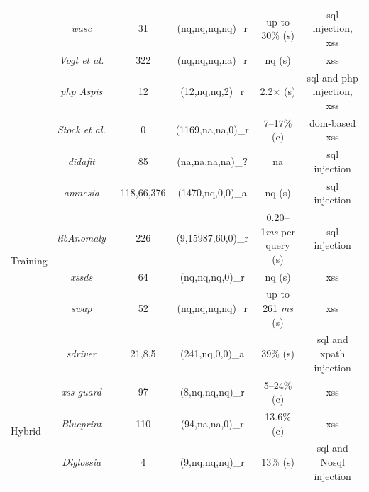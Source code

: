 \documentclass[conference]{IEEEtran}
\newcommand{\xmark}{\ding{56}}
\begin{document}
\begin{landscape}
\begin{table}
\begin{threeparttable}
\begin{small}
{\begin{tabular}{l|c|c|cc|c}
  &  	{\it {\sc wasc}}~\cite{NLC07} & 31 & ({\sc nq},{\sc nq},{\sc nq},{\sc nq})\_r & up to 30\% ({\sc s}) & {\sc sql} injection, {\sc xss} \\
	&  	{\it Vogt et al.}~\cite{VFJKKV07} & 322 & ({\sc nq},{\sc nq},{\sc nq},{\sc na})\_r & {\sc nq} ({\sc s}) & {\sc xss} \\
	&  	{\it {\sc php} Aspis}~\cite{PMP11} & 12 & (12,{\sc nq},{\sc nq},2)\_r & 2.2$\times$ ({\sc s}) & {\sc sql} and {\sc php} injection, {\sc xss} \\
	& 	{\it Stock et al.}~\cite{SLMS14} & 0 & (1169,{\sc na},{\sc na},0)\_r & 7--17\% ({\sc c}) & {\sc dom}-based {\sc xss} \\
	\hline
	\hline  
  \multirow{6}{*}{Training}
  &   {\it {\sc didafit}}~\cite{LLW02} & 85 & ({\sc na},{\sc na},{\sc na},{\sc na})\_{\bf ?} & {\sc na} & {\sc sql} injection \\
	&   {\it {\sc amnesia}}~\cite{HO05,HO06,HO05b} & 118,66,376 & (1470,{\sc nq},0,0)\_a & {\sc nq} ({\sc s}) & {\sc sql} injection \\ 
	&   {\it libAnomaly}~\cite{VMV05} & 226 & (9,15987,60,0)\_r & 0.20--1{\it ms} per query ({\sc s}) & {\sc sql} injection \\
	& 	{\it {\sc xssds}}~\cite{JEP08} & 64 & ({\sc nq},{\sc nq},{\sc nq},0)\_r & {\sc nq} ({\sc s}) & {\sc xss} \\
  & 	{\it {\sc swap}}~\cite{WPLKK09} & 52 & ({\sc nq},{\sc nq},{\sc nq},{\sc nq})\_r & up to 261 {\it ms} ({\sc s}) & {\sc xss} \\ 
	& 	{\it {\sc sd}river}~\cite{MS09,MKS09,MKLS11} & 21,8,5 & (241,{\sc nq},0,0)\_a & 39\% ({\sc s}) & {\sc sql} and {\sc xp}ath injection \\
  \hline
  \hline
  \multirow{3}{*}{Hybrid}
  &   {\it {\sc xss-guard}}~\cite{BV08} & 97 & (8,{\sc nq},{\sc nq},{\sc nq})\_r & 5--24\% ({\sc c}) & {\sc xss} \\
  &   {\it Blueprint}~\cite{LV09} & 110 & (94,{\sc na},{\sc na},0)\_r & 13.6\% ({\sc c}) & {\sc xss} \\
  &   {\it Diglossia}~\cite{SMS13} & 4 & (9,{\sc nq},{\sc nq},{\sc nq})\_r & 13\% ({\sc s}) & {\sc sql} and No{\sc sql} injection \\
	\hline
    \end{tabular}}
    \begin{tablenotes}
	\begin{footnotesize}

\end{footnotesize}
\end{tablenotes}
\end{small}
\end{threeparttable}
\end{table}
\end{landscape}
\end{document}
